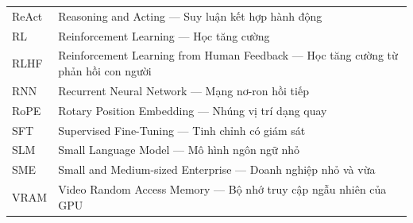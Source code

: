 \begin{longtable}{@{}p{2.6cm}p{\dimexpr\textwidth-3.1cm\relax}@{}}
ReAct & Reasoning and Acting --- Suy luận kết hợp hành động \\
RL & Reinforcement Learning --- Học tăng cường \\
RLHF & Reinforcement Learning from Human Feedback --- Học tăng cường từ phản hồi con người \\
RNN & Recurrent Neural Network --- Mạng nơ-ron hồi tiếp \\
RoPE & Rotary Position Embedding --- Nhúng vị trí dạng quay \\
SFT & Supervised Fine-Tuning --- Tinh chỉnh có giám sát \\
SLM & Small Language Model --- Mô hình ngôn ngữ nhỏ \\
SME & Small and Medium-sized Enterprise --- Doanh nghiệp nhỏ và vừa \\
VRAM & Video Random Access Memory --- Bộ nhớ truy cập ngẫu nhiên của GPU \\
\end{longtable}
\endgroup
